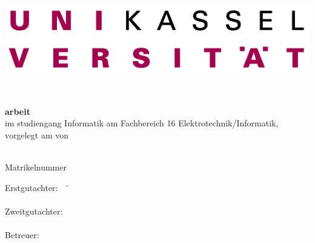 
\begin{titlepage}
  \begin{center}
    \includegraphics[width=0.4\linewidth]{stuff/title_page/logo-uni}
    
    \vspace{3.0cm}
    
    \huge {\textbf{\thesisTitle}} \\[5mm]
    \Large {\thesisSubTitle}
  \end{center}
  
  \vspace{3.5cm}
  
  \begin{flushleft}
    {\large\textbf{\thesiskind{}arbeit}}\\
    
    im \thesiskind{}studiengang Informatik am Fachbereich 16 Elektrotechnik/Informatik, vorgelegt am \deadline{} von
    
    \vspace{1.5cm}
    
    \textbf{\thesisauthor}\\
    Matrikelnummer \studentId
    
    \vspace{1.5cm}
    
    \begin{tabbing}
    Erstgutachter:~~ \= \firstReviewer\\
    \>\firstReviewerInstitution \\[5mm]
    Zweitgutachter: \> \secondReviewer \\
    \>\secondReviewerInstitution \\[5mm]
    Betreuer: \>\supervisor \\
              \>\supervisorInstitution
    \end{tabbing}
  \end{flushleft}
  
\end{titlepage}